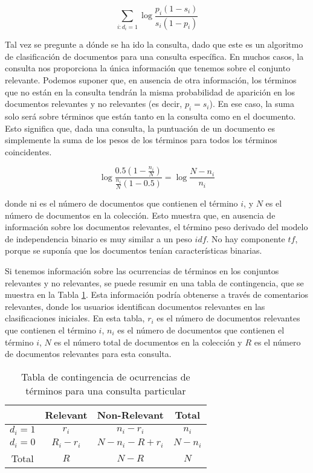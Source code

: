 $$\sum_{i:d_i=1}\log{\frac{p_i(1-s_i)}{s_i(1-p_i)}}$$

Tal vez se pregunte a dónde se ha ido la consulta, dado que este es un algoritmo de clasificación de documentos para una consulta específica. En muchos casos, la consulta nos proporciona la única información que tenemos sobre el conjunto relevante. Podemos suponer que, en ausencia de otra información, los términos que no están en la consulta tendrán la misma probabilidad de aparición en los documentos relevantes y no relevantes (es decir, $p_i = s_i$). En ese caso, la suma solo será sobre términos que están tanto en la consulta como en el documento. Esto significa que, dada una consulta, la puntuación de un documento es simplemente la suma de los pesos de los términos para todos los términos coincidentes.

$$\log{\frac{0.5(1-\frac{n_i}{N})}{\frac{n_i}{N}(1-0.5)}}=\log{\frac{N-n_i}{n_i}}$$

donde ni es el número de documentos que contienen el término $i$, y $N$ es el número de documentos en la colección. Esto muestra que, en ausencia de información sobre los documentos relevantes, el término peso derivado del modelo de independencia binario es muy similar a un peso $idf$. No hay componente $tf$, porque se suponía que los documentos tenían características binarias.

Si tenemos información sobre las ocurrencias de términos en los conjuntos relevantes y no relevantes, se puede resumir en una tabla de contingencia, que se muestra en la Tabla \ref{tab:TablaContigencia}. Esta información podría obtenerse a través de comentarios relevantes, donde los usuarios identifican documentos relevantes en las clasificaciones iniciales. En esta tabla, $r_i$ es el número de documentos relevantes que contienen el término $i$, $n_i$ es el número de documentos que contienen el término $i$, $N$ es el número total de documentos en la colección y $R$ es el número de documentos relevantes para esta consulta.

\begin{table}[H]
	\begin{center}
		\begin{tabular}{|c|c|c|c|}
			\hline			
			 & Relevant & Non-Relevant & Total \\ \hline
			$d_i=1$ & $r_i$ & $n_i-r_i$ & $n_i$ \\ 
			$d_i=0$ & $R_i-r_i$ & $N-n_i-R+r_i$ & $N-n_i$ \\ \hline 
			Total & $R$ & $N-R$ & $N$ \\ \hline
		\end{tabular}
	\end{center}
	\caption{\label{tab:TablaContigencia}Tabla de contingencia de ocurrencias de términos para una consulta particular}
\end{table}

